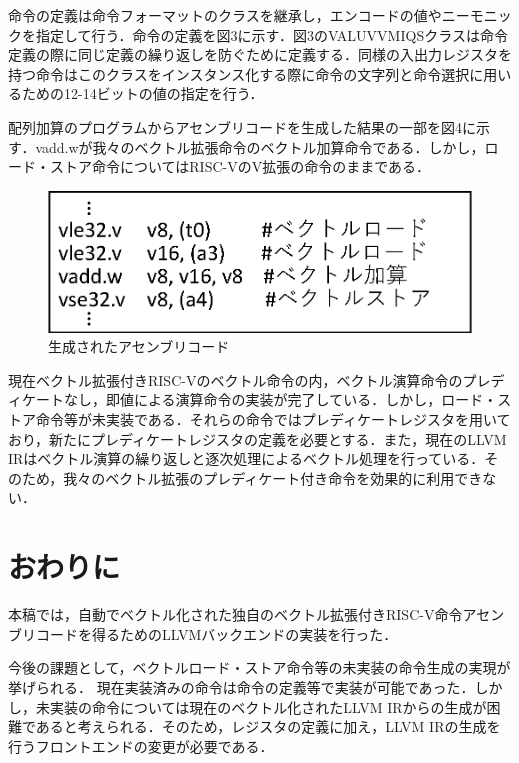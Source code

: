 \documentclass[a4paper,9pt, twocolumn]{jarticle}
\begin{document}
命令の定義は命令フォーマットのクラスを継承し，エンコードの値やニーモニックを指定して行う．命令の定義を図3に示す．図3のVALUVVMIQSクラスは命令定義の際に同じ定義の繰り返しを防ぐために定義する．同様の入出力レジスタを持つ命令はこのクラスをインスタンス化する際に命令の文字列と命令選択に用いるための12-14ビットの値の指定を行う．

配列加算のプログラムからアセンブリコードを生成した結果の一部を図4に示す．vadd.wが我々のベクトル拡張命令のベクトル加算命令である．しかし，ロード・ストア命令についてはRISC-VのV拡張の命令のままである．

\begin{figure}[tb]
    \centering
    \includegraphics[scale=0.4]{miqs_assembly.eps}
    \vspace{-2truemm}
    \caption{生成されたアセンブリコード}
    \vspace{-4truemm}
    \label{fig:assembly}
\end{figure}

現在ベクトル拡張付きRISC-Vのベクトル命令の内，ベクトル演算命令のプレディケートなし，即値による演算命令の実装が完了している．しかし，ロード・ストア命令等が未実装である．それらの命令ではプレディケートレジスタを用いており，新たにプレディケートレジスタの定義を必要とする．また，現在のLLVM IRはベクトル演算の繰り返しと逐次処理によるベクトル処理を行っている．そのため，我々のベクトル拡張のプレディケート付き命令を効果的に利用できない．

\section{おわりに}
本稿では，自動でベクトル化された独自のベクトル拡張付きRISC-V命令アセンブリコードを得るためのLLVMバックエンドの実装を行った．

今後の課題として，ベクトルロード・ストア命令等の未実装の命令生成の実現が挙げられる．
現在実装済みの命令は命令の定義等で実装が可能であった．しかし，未実装の命令については現在のベクトル化されたLLVM IRからの生成が困難であると考えられる．そのため，レジスタの定義に加え，LLVM IRの生成を行うフロントエンドの変更が必要である．
\end{document}
